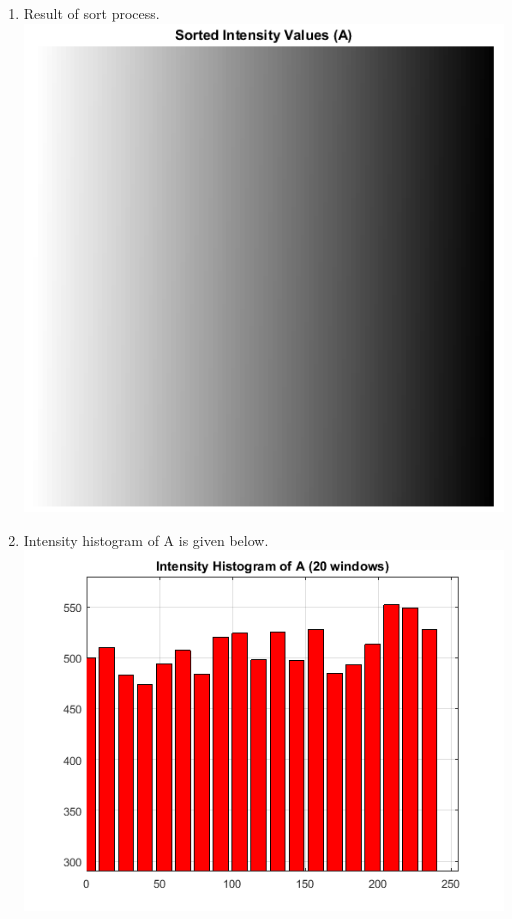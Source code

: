 \documentclass{article}
\begin{document}
\begin{enumerate}
			\begin{enumerate}		  
				\pagebreak
				\item Result of sort process. \\
				\includegraphics[width=\linewidth]{plots/1-A-4/a_sorted.png}
			
				\pagebreak 
				\item Intensity histogram of A is given below. \\
				\includegraphics[width=\linewidth]{plots/1-A-4/b.png}
				

\end{enumerate}
\end{enumerate}
\end{document}
